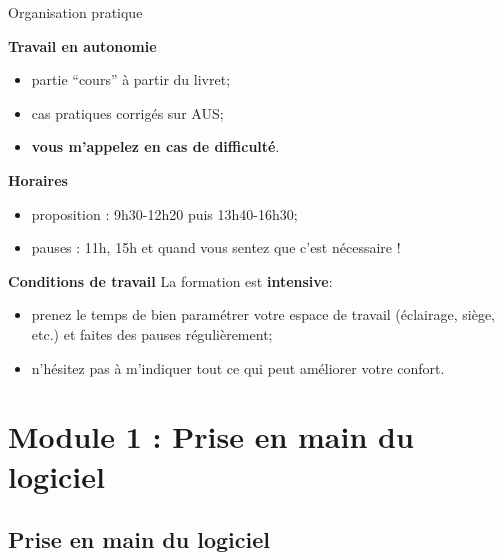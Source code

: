 \documentclass[12pt,ignorenonframetext,]{beamer}
\newcommand{\strong}[1]{\textbf{\textcolor{redInsee}{#1}}}
\begin{document}
\begin{frame}{Organisation pratique}
\protect\hypertarget{organisation-pratique}{}

\strong{Travail en autonomie}

\begin{itemize}
\item
  \vspace{-0.2cm}

  partie \enquote{cours} à partir du livret;
\item
  cas pratiques corrigés sur AUS;
\item
  \pause \textbf{vous m'appelez en cas de difficulté}.
\end{itemize}

\bigskip \pause \strong{Horaires}

\begin{itemize}
\item
  \vspace{-0.2cm}

  proposition : 9h30-12h20 puis 13h40-16h30;
\item
  pauses : 11h, 15h et quand vous sentez que c’est nécessaire !
\end{itemize}

\bigskip \pause \strong{Conditions de travail} La formation est
\textbf{intensive}:

\begin{itemize}
\item
  \vspace{-0.2cm}

  prenez le temps de bien paramétrer votre espace de travail (éclairage,
  siège, etc.) et faites des pauses régulièrement;
\item
  n’hésitez pas à m’indiquer tout ce qui peut améliorer votre confort.
\end{itemize}

\end{frame}

\hypertarget{module-1-prise-en-main-du-logiciel}{%
\section{Module 1 : Prise en main du
logiciel}\label{module-1-prise-en-main-du-logiciel}}

\hypertarget{prise-en-main-du-logiciel}{%
\subsection*{Prise en main du
logiciel}\label{prise-en-main-du-logiciel}}
\end{document}
